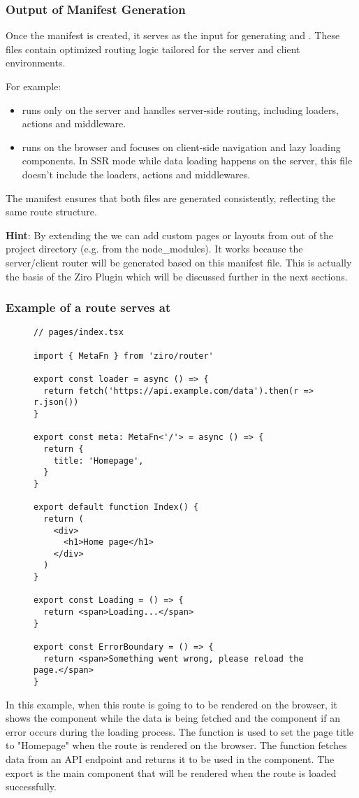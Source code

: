 \subsubsection{Output of Manifest Generation}
Once the manifest is created, it serves as the input for generating  and . These files contain optimized routing logic tailored for the server and client environments.

For example:
\begin{itemize}
  \item {} runs only on the server and handles server-side routing, including loaders, actions and middleware.
  \item {} runs on the browser and focuses on client-side navigation and lazy loading components. In SSR mode while data loading happens on the server, this file doesn't include the loaders, actions and middlewares.
\end{itemize}
The manifest ensures that both files are generated consistently, reflecting the same route structure.

\textbf{Hint}: By extending the  we can add custom pages or layouts from out of the project directory (e.g. from the node\_modules). It works because the server/client router will be generated based on this manifest file. This is actually the basis of the Ziro Plugin which will be discussed further in the next sections.

\subsubsection{Example of a route serves at \cc{/}}
\begin{figure}[H]
\begin{verbatim}
// pages/index.tsx

import { MetaFn } from 'ziro/router'

export const loader = async () => {
  return fetch('https://api.example.com/data').then(r => r.json())
}

export const meta: MetaFn<'/'> = async () => {
  return {
    title: 'Homepage',
  }
}

export default function Index() {
  return (
    <div>
      <h1>Home page</h1>
    </div>
  )
}

export const Loading = () => {
  return <span>Loading...</span>
}

export const ErrorBoundary = () => {
  return <span>Something went wrong, please reload the page.</span>
}
\end{verbatim}
\end{figure}
In this example, when this route is going to to be rendered on the browser, it shows the  component while the data is being fetched and the  component if an error occurs during the loading process. The  function is used to set the page title to "Homepage" when the route is rendered on the browser. The  function fetches data from an API endpoint and returns it to be used in the component. The  export is the main component that will be rendered when the route is loaded successfully.
\pagebreak

